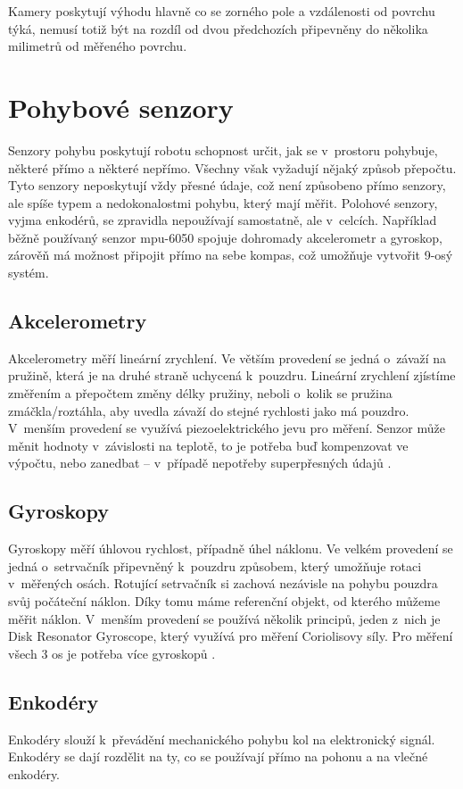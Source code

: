 Kamery poskytují výhodu hlavně co se zorného pole a vzdálenosti od povrchu týká, nemusí totiž být na rozdíl od dvou předchozích připevněny do několika milimetrů od měřeného povrchu.

\section{Pohybové senzory} 
Senzory pohybu poskytují robotu schopnost určit, jak se v~prostoru pohybuje, některé přímo a některé nepřímo.
Všechny však vyžadují nějaký způsob přepočtu.
Tyto senzory neposkytují vždy přesné údaje, což není způsobeno přímo senzory, ale spíše typem a nedokonalostmi pohybu, který mají měřit.
Polohové senzory, vyjma enkodérů, se zpravidla nepoužívají samostatně, ale v~celcích.
Například běžně používaný senzor mpu-6050 \cite{mpu6050} spojuje dohromady akcelerometr a gyroskop, zárověň má možnost připojit přímo na sebe kompas, což umožňuje vytvořit 9-osý systém.


\subsection{Akcelerometry}
Akcelerometry měří lineární zrychlení.
Ve větším provedení se jedná o~závaží na pružině, která je na druhé straně uchycená k~pouzdru. 
Lineární zrychlení zjístíme změřením a přepočtem změny délky pružiny, neboli o~kolik se pružina zmáčkla/roztáhla, aby uvedla závaží do stejné rychlosti jako má pouzdro.
V~menším provedení se využívá piezoelektrického jevu pro měření.
Senzor může měnit hodnoty v~závislosti na teplotě, to je potřeba buď kompenzovat ve výpočtu, nebo zanedbat -- v~případě nepotřeby superpřesných údajů \cite{accel}.

\subsection{Gyroskopy}
Gyroskopy měří úhlovou rychlost, případně úhel náklonu.
Ve velkém provedení se jedná o~setrvačník připevněný k~pouzdru způsobem, který umožňuje rotaci v~měřených osách.
Rotující setrvačník si zachová nezávisle na pohybu pouzdra svůj počáteční náklon.
Díky tomu máme referenční objekt, od kterého můžeme měřit náklon.
V~menším provedení se používá několik principů, jeden z~nich je Disk Resonator Gyroscope, který využívá pro měření Coriolisovy síly.
Pro měření všech 3 os je potřeba více gyroskopů
\cite{gyro}
\cite{gyro-2}.

\subsection{Enkodéry}
Enkodéry slouží k~převádění mechanického pohybu kol na elektronický signál.
Enkodéry se dají rozdělit na ty, co se používají přímo na pohonu a na vlečné enkodéry.

